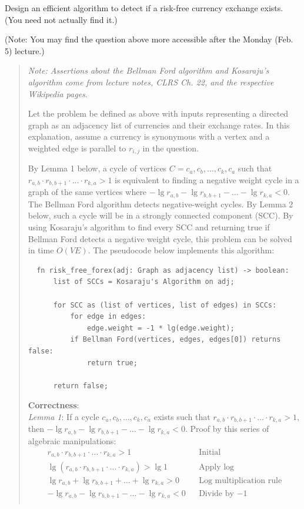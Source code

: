 \documentclass[11pt]{article}
\begin{document}
\begin{enumerate}
Design an efficient algorithm to detect if a risk-free currency exchange
exists.  (You need not actually find it.)

(Note: You may find the question above more accessible after the Monday (Feb. 5) lecture.)

\begin{quote}
  \color{purple}
  \textit{Note: Assertions about the Bellman Ford algorithm and Kosaraju's algorithm come from lecture notes, CLRS Ch. 22, and the respective Wikipedia pages}.

  \medskip
  Let the problem be defined as above with inputs representing a directed graph as an adjacency list of currencies and their exchange rates. In this explanation, assume a currency is synonymous with a vertex and a weighted edge is parallel to $r_{i,j}$ in the question.

  \medskip
  By Lemma 1 below, a cycle of vertices $C = c_a, c_b, \dots, c_k, c_a$ such that $r_{a, b} \cdot r_{b, b + 1} \cdot \dots \cdot r_{k, a} > 1$ is equivalent to finding a negative weight cycle in a graph of the same vertices where $-\lg r_{a, b} - \lg r_{b, b + 1} - \dots - \lg r_{k, a} < 0$. The Bellman Ford algorithm detects negative-weight cycles. By Lemma 2 below, such a cycle will be in a strongly connected component (SCC). By using Kosaraju's algorithm to find every SCC and returning true if Bellman Ford detects a negative weight cycle, this problem can be solved in time $O(VE)$. The pseudocode below implements this algorithm:

  \begin{verbatim}
  fn risk_free_forex(adj: Graph as adjacency list) -> boolean:
      list of SCCs = Kosaraju's Algorithm on adj;

      for SCC as (list of vertices, list of edges) in SCCs:
          for edge in edges:
              edge.weight = -1 * lg(edge.weight);
          if Bellman Ford(vertices, edges, edges[0]) returns false: 
              return true;

      return false; 
  \end{verbatim}

\medskip 
\textbf{Correctness}:\\ 
\textit{Lemma 1}: If a cycle $c_a, c_b, \dots, c_k, c_a$ exists such that $r_{a, b} \cdot r_{b, b + 1} \cdot \dots \cdot r_{k, a} > 1$, then $-\lg r_{a, b} - \lg r_{b, b + 1} - \dots - \lg r_{k, a} < 0$. Proof by this series of algebraic manipulations: 
\begin{align*}
    && r_{a, b} \cdot r_{b, b + 1} \cdot \dots \cdot r_{k, a} > 1 && \text{Initial} && \\
    && \lg (r_{a, b} \cdot r_{b, b + 1} \cdot \dots \cdot r_{k, a}) > \lg 1 && \text{Apply log} && \\
    && \lg r_{a, b} + \lg r_{b, b + 1} + \dots + \lg r_{k, a} > 0 && \text{Log multiplication rule} && \\
    && -\lg r_{a, b} - \lg r_{b, b + 1} - \dots - \lg r_{k, a} < 0 && \text{Divide by $-1$} && \\
\end{align*} 


\end{quote}
\end{enumerate}
\end{document}
